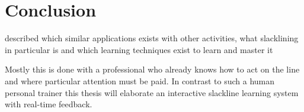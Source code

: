 \section{Conclusion}
 described which similar applications exists with other activities, what slacklining in particular is and which learning techniques exist to learn and master it
 
 Mostly this is done with a professional who already knows how to act on the line and where particular attention must be paid. In contrast to such a human personal trainer this thesis will elaborate an interactive slackline learning system with real-time feedback. 
